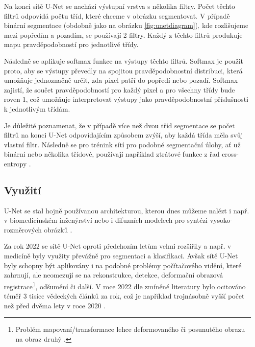 Na konci sítě U-Net se nachází výstupní vrstva s několika filtry. Počet těchto filtrů odpovídá počtu tříd, které chceme v obrázku segmentovat. V případě binární segmentace (obdobně jako na obrázku \ref{fig:unetdiagram}), kde rozlišujeme mezi popředím a pozadím, se používají 2 filtry. Každý z těchto filtrů produkuje mapu pravděpodobností pro jednotlivé třídy.

Následně se aplikuje softmax funkce na výstupy těchto filtrů. Softmax je použit proto, aby se výstupy převedly na spojitou pravděpodobnostní distribuci, která umožňuje jednoznačně určit, zda pixel patří do popředí nebo pozadí. Softmax zajistí, že součet pravděpodobností pro každý pixel a pro všechny třídy bude roven 1, což umožňuje interpretovat výstupy jako pravděpodobnostní příslušnosti k jednotlivým třídám.

Je důležité poznamenat, že v případě více než dvou tříd segmentace se počet filtrů na konci U-Net odpovídajícím způsobem zvýší, aby každá třída měla svůj vlastní filtr. Následně se pro trénink sítí pro podobné segmentační úlohy, ať už binární nebo několika třídové, používají například ztrátové funkce z řad cross-entropy \cite{unet}.

\subsection{Využití}
\label{subsec:Chapter223}

U-Net se stal hojně používanou architekturou, kterou dnes můžeme nalézt i např. v biomedicínském inženýrství \cite{unet_success} nebo i difuzních modelech pro syntézi vysoko-rozměrových obrázků \cite{stablediffusion}.

Za rok 2022 se sítě U-Net oproti předchozím letům velmi rozšířily a např. v medicíně byly využity převážně pro segmentaci a klasifikaci. Avšak sítě U-Net byly schopny být aplikovány i na podobné problémy počítačového vidění, které zahrnují, ale neomezují se na rekonstrukce, detekce, deformační obrazová registrace\footnote{Problém mapovaní/transformace lehce deformovaného či posunutého obrazu na obraz druhý \cite{unet_registration}.}, odšumění či další. V roce 2022 dle zmíněné literatury bylo ocitováno téměř 3 tisíce vědeckých článků za rok, což je například trojnásobně vyšší počet než před dvěma lety v roce 2020 \cite{unet_success}.

\endinput